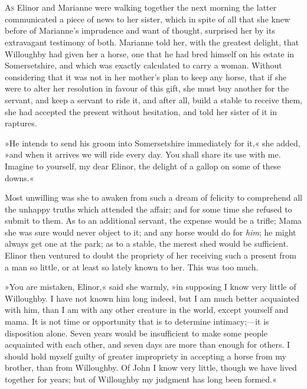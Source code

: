 \chapter[Chapter \thechapter]{}
\lettrine[lines=4,lraise=0.3]{A}{s} Elinor and Marianne were walking together the next morning the latter communicated a piece of news to her sister, which in spite of all that she knew before of Marianne’s imprudence and want of thought, surprised her by its extravagant testimony of both. Marianne told her, with the greatest delight, that Willoughby had given her a horse, one that he had bred himself on his estate in Somersetshire, and which was exactly calculated to carry a woman. Without considering that it was not in her mother’s plan to keep any horse, that if she were to alter her resolution in favour of this gift, she must buy another for the servant, and keep a servant to ride it, and after all, build a stable to receive them, she had accepted the present without hesitation, and told her sister of it in raptures.

»He intends to send his groom into Somersetshire immediately for it,« she added, »and when it arrives we will ride every day. You shall share its use with me. Imagine to yourself, my dear Elinor, the delight of a gallop on some of these downs.«

Most unwilling was she to awaken from such a dream of felicity to comprehend all the unhappy truths which attended the affair; and for some time she refused to submit to them. As to an additional servant, the expense would be a trifle; Mama she was sure would never object to it; and any horse would do for \textit{him}; he might always get one at the park; as to a stable, the merest shed would be sufficient. Elinor then ventured to doubt the propriety of her receiving such a present from a man so little, or at least so lately known to her. This was too much.

»You are mistaken, Elinor,« said she warmly, »in supposing I know very little of Willoughby. I have not known him long indeed, but I am much better acquainted with him, than I am with any other creature in the world, except yourself and mama. It is not time or opportunity that is to determine intimacy;—it is disposition alone. Seven years would be insufficient to make some people acquainted with each other, and seven days are more than enough for others. I should hold myself guilty of greater impropriety in accepting a horse from my brother, than from Willoughby. Of John I know very little, though we have lived together for years; but of Willoughby my judgment has long been formed.«

